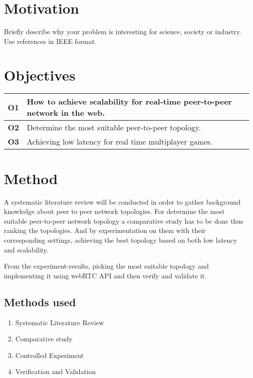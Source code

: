 \documentclass[12pt]{article}
\begin{document}
\section*{Motivation}
Briefly describe why your problem is interesting for science, society or industry. Use references in IEEE format\cite{Chalmers:2013,Darwin:1859}.

\section*{Objectives}

\begin{tabular} {|p{1.2cm}|p{11.6cm}|} \hline
\textbf{O1} & How to achieve scalability for real-time peer-to-peer network in the web. \\ \hline
\textbf{O2} & Determine the most suitable peer-to-peer topology. \\ \hline
\textbf{O3} & Achieving low latency for real time multiplayer games. \\ \hline
\end{tabular}

\section*{Method}
A systematic literature review will be conducted in order to gather background 
knowledge about peer to peer network topologies. For determine the most suitable 
peer-to-peer network topology a comparative study has to be done thus ranking the 
topologies. And by experimentation on them with their corresponding settings, 
achieving the best topology based on both low latency and scalability. 


\noindent\newline From the experiment-results, picking the most suitable topology 
and implementing it using webRTC API and then verify and validate it.

\subsection*{Methods used}
\begin{enumerate}
  \item Systematic Literature Review
  \item Comparative study
  \item Controlled Experiment
  \item Verification and Validation 
\end{enumerate}
\end{document}
